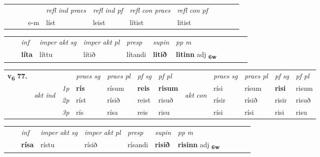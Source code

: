 \begin{tabular}{llllllllllll}
 & &  & &  \textit{refl ind praes} & \textit{refl ind pf} & \textit{refl con praes} & \textit{refl con pf} \\*
&  & & e-m & líst & leist & lítist & litist \\*
\cmidrule{5-9}
\end{tabular}


\begin{tabular}{llllllllllll}
 & & \textit{inf} & \textit{imper akt sg} & \textit{imper akt pl}   & \textit{presp} & \textit{supin}  & \textit{pp m}     \\*
  & & \textbf{líta} & líttu  & lítið   & lítandi &  \textbf{litið}  & \textbf{litinn} adj \textbf{\textsubscript{6w}} \\*
\cmidrule{1-12}
\end{tabular}



\begin{tabular}{llllllllllll} \toprule
\multirow{4}{*}{{{\textbf{v{\textsubscript{6}}} \Large{\textbf{77.}}}}}  & &   &  \textit{praes sg}  & \textit{praes pl}  &\textit{ pf sg} & \textit{pf pl} &  &  \textit{praes sg}  & \textit{praes pl}  & \textit{pf sg} & \textit{pf pl } \\*
	\cmidrule{4-7} \cmidrule{9-12}
 & \multirow{3}{*}{\begin{turn}{90}\textit{akt ind}\end{turn}} & {\textit{1p}} & \textbf{rís} & rísum    & \textbf{reis} & \textbf{risum} & \multirow{3}{*}{\begin{turn}{90}\textit{akt con}\end{turn}} &rísi & rísum & \textbf{risi} & risum\\*
& &  {\textit{2p}} &  ríst  & rísið   & reist & risuð & & rísir & rísið & risir & risuð \\*
& &  {\textit{3p}} & rís & rísa   & reis & risu & & rísi & rísi& risi & risu  \\*
\cmidrule{4-7} \cmidrule{9-12}
\end{tabular}


\begin{tabular}{llllllllllll}
 & & \textit{inf} & \textit{imper akt sg} & \textit{imper akt pl}   & \textit{presp} & \textit{supin}  & \textit{pp m}     \\*
  & & \textbf{rísa} & rístu  & rísið   & rísandi &  \textbf{risið}  & \textbf{risinn} adj \textbf{\textsubscript{6w}} \\*
\cmidrule{1-12}
\end{tabular}



